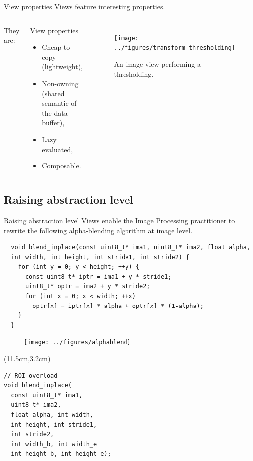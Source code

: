 \documentclass[12pt,aspectratio=169]{beamer}
\begin{document}
\begin{frame}[fragile]{View properties}
  Views feature interesting properties.
  \begin{columns}[T,onlytextwidth]
    They are:
    \begin{alertblock}{View properties}
      \begin{itemize}
        \item Cheap-to-copy (lightweight),
        \item Non-owning (shared semantic of the data buffer),
        \item Lazy evaluated,
        \item Composable.
      \end{itemize}
    \end{alertblock}

    \begin{figure}
      \begin{minipage}{\linewidth}
        \texttt{[image: ../figures/transform\_thresholding]}
      \end{minipage}
      \caption{An image view performing a thresholding.}
      \label{fig.view.threshold}
    \end{figure}
  \end{columns}
\end{frame}

\subsection{Raising abstraction level}

\begin{frame}[fragile]{Raising abstraction level}
  Views enable the Image Processing practitioner to rewrite the following alpha-blending algorithm at image level.
  \begin{verbatim}
  void blend_inplace(const uint8_t* ima1, uint8_t* ima2, float alpha,
  int width, int height, int stride1, int stride2) {
    for (int y = 0; y < height; ++y) {
      const uint8_t* iptr = ima1 + y * stride1;
      uint8_t* optr = ima2 + y * stride2;
      for (int x = 0; x < width; ++x)
        optr[x] = iptr[x] * alpha + optr[x] * (1-alpha);
    }
  }
  \end{verbatim}
  \begin{figure}
    \flushleft
    \texttt{[image: ../figures/alphablend]}
  \end{figure}
  \begin{textblock*}{4.5cm}(11.5cm,3.2cm)
    \begin{verbatim}
// ROI overload
void blend_inplace(
  const uint8_t* ima1,
  uint8_t* ima2,
  float alpha, int width,
  int height, int stride1,
  int stride2,
  int width_b, int width_e
  int height_b, int height_e);
    \end{verbatim}
  \end{textblock*}
\end{frame}
\end{document}
